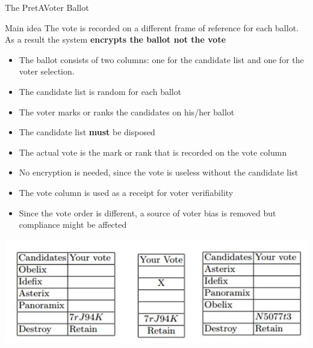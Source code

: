 \documentclass{beamer}
\begin{document}
\begin{frame}[allowframebreaks]{The PretAVoter Ballot}
\begin{block}{Main idea}
The vote is recorded on a different frame of reference for each ballot.\\
As a result the system \textbf{encrypts the ballot not the vote}
\end{block}

 
\begin{itemize}
\item The ballot consists of two columns: one for the candidate list and one for the voter selection.
\item The candidate list is random for each ballot
\item The voter marks or ranks the candidates on his/her ballot
\item The candidate list \textbf{must} be disposed
\item The actual vote is the mark or rank that is recorded on the vote column
\item No encryption is needed, since the vote is useless without the candidate list
\item The vote column is used as a receipt for voter verifiability
\item Since the vote order is different, a source of voter bias is removed but compliance might be affected
\end{itemize}

\begin{center}
\includegraphics[scale=0.5]{ballot}
\end{center}


\end{frame}
\end{document}
